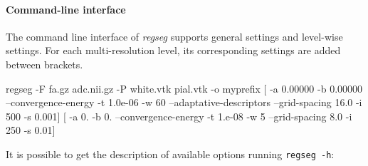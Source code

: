\documentclass[a4paper]{report}
\newcommand*{\codeinline}[1]{\colorbox{listingbg}{\lstinline!#1!}}
\begin{document}
\paragraph{Command-line interface}
The command line interface of \emph{regseg} supports general settings and level-wise settings.
For each multi-resolution level, its corresponding settings are added between brackets.

\begin{bashcode}
regseg -F fa.gz adc.nii.gz -P white.vtk pial.vtk -o myprefix [ -a 0.00000 -b 0.00000 --convergence-energy -t 1.0e-06 -w 60 --adaptative-descriptors --grid-spacing 16.0 -i 500 -s 0.001] [ -a 0. -b 0. --convergence-energy -t 1.e-08 -w 5 --grid-spacing 8.0 -i 250 -s 0.01]
\end{bashcode}


It is possible to get the description of available options running
  \codeinline{regseg -h}:
\end{document}
